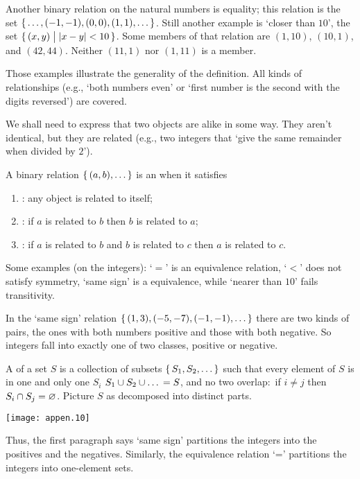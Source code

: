 Another binary relation on the natural numbers is equality; this relation is
the set
\( \mbox{$\{\,\ldots,(-1,-1),(0,0),(1,1),\ldots\,\}$} \).
Still another example is `closer than \( 10 \)', the set
\( \mbox{$\{\,(x,y)\bigm| |x-y|<10 \,\}$} \).
Some members of that relation are \( (1,10) \), \( (10,1) \),
and \( (42,44) \).
Neither \( (11,1) \) nor \( (1,11) \) is a member.

Those examples illustrate the generality of the definition.
All kinds of relationships (e.g., `both numbers
even' or `first number is the second with the digits reversed')
are covered.




We shall need to express that two objects are alike in some way.
They aren't identical, but they are related
(e.g., two integers that `give the same remainder when divided by \( 2 \)').

A binary relation \( \mbox{$\{\,(a,b),\ldots \,\}$} \)
is an 
when it satisfies
\begin{enumerate}
  \item {}: 
     any object is related to itself;
  \item {}: 
     if \( a \) is related to \( b \) then
     \( b \) is related to \( a \);
 \item {}:
     if \( a \) is related to \( b \) and \( b \) is
     related to \( c \) then \( a \) is related to \( c \).
\end{enumerate}
Some examples (on the integers): `\( = \)' is an equivalence relation,
`\( < \)' does not satisfy symmetry,
`same sign' is a equivalence, while `nearer than \( 10 \)' fails transitivity.






In the `same sign' relation \( \mbox{$\{\, (1,3),(-5,-7),(-1,-1),\ldots\,\}$} \)
there are two kinds of pairs, the ones with both numbers positive
and those with both negative.
So integers fall into exactly one of two classes, positive or negative.

A  
of a set \( S \) is a collection of subsets
\( \mbox{$\{\,S_1,S_2,\ldots\,\}$} \) such that
every element of \( S \) is in one and only one \( S_i \)
\( S_1\cup S_2\cup \ldots{} = S \), and
no two overlap:~if \( i\neq j \) then
\( S_i\cap S_j=\varnothing \).
Picture \( S \) as decomposed into distinct parts.
\begin{center}
  \texttt{[image: appen.10]}
\end{center}
Thus, the first paragraph says `same sign' partitions
the integers into the positives and the negatives.
Similarly, the equivalence relation `=' partitions the integers into
one-element sets.

